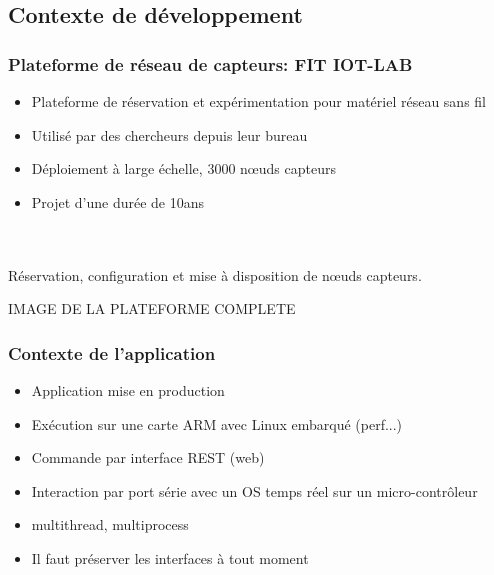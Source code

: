 \documentclass[9pt]{beamer}
\newcommand{\tocsubsection}{
  \begin{frame}
    \tableofcontents[
      currentsubsection,
      sectionstyle=show/shaded,
      subsectionstyle=show/shaded,
      subsubsectionstyle=show/show/shaded
    ]
  \end{frame}
}
\begin{document}
\subsection{Contexte de développement}
\tocsubsection

\subsubsection{Plateforme de réseau de capteurs: FIT IOT-LAB}
\begin{frame}{\subsubsecname} %
  \begin{itemize}
    \item <2->{Plateforme de réservation et expérimentation pour matériel réseau sans fil}
    \item <2->{Utilisé par des chercheurs depuis leur bureau}
    \item <2->{Déploiement à large échelle, 3000 nœuds capteurs}
    \item <2->{Projet d'une durée de 10ans}
  \end{itemize}
   ~\\~\\ Réservation, configuration et mise à disposition de nœuds capteurs.
\end{frame}


\begin{frame}{\subsubsecname} %

  IMAGE DE LA PLATEFORME COMPLETE

\end{frame}

\subsubsection{Contexte de l'application}
\begin{frame}{\subsubsecname} %
  \begin{itemize}
    \item Application mise en production
    \item Exécution sur une carte ARM avec Linux embarqué (perf...)
    \item Commande par interface REST (web)
    \item Interaction par port série avec un OS temps réel sur un micro-contrôleur
    \item multithread, multiprocess
    \item Il faut préserver les interfaces à tout moment
  \end{itemize}
\end{frame}
\end{document}
